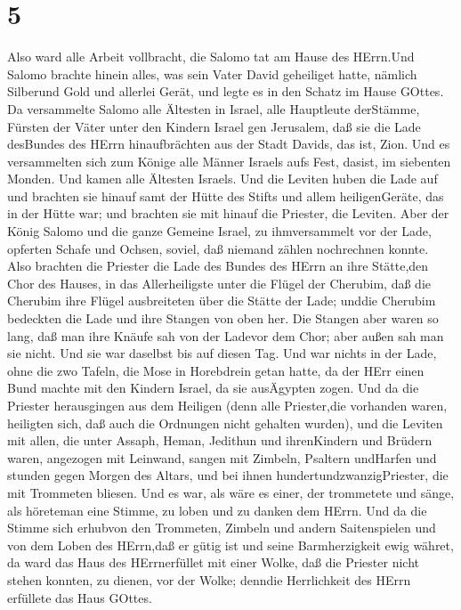 \hypertarget{section-4}{%
\section{5}\label{section-4}}

 Also ward alle Arbeit vollbracht, die Salomo tat am Hause
des HErrn.Und Salomo brachte hinein alles, was sein Vater David
geheiliget hatte, nämlich Silberund Gold und allerlei Gerät, und legte
es in den Schatz im Hause GOttes.  Da versammelte Salomo
alle Ältesten in Israel, alle Hauptleute derStämme, Fürsten der Väter
unter den Kindern Israel gen Jerusalem, daß sie die Lade desBundes des
HErrn hinaufbrächten aus der Stadt Davids, das ist, Zion. 
Und es versammelten sich zum Könige alle Männer Israels aufs Fest,
dasist, im siebenten Monden.  Und kamen alle Ältesten
Israels. Und die Leviten huben die Lade auf  und brachten
sie hinauf samt der Hütte des Stifts und allem heiligenGeräte, das in
der Hütte war; und brachten sie mit hinauf die Priester, die Leviten.
 Aber der König Salomo und die ganze Gemeine Israel, zu
ihmversammelt vor der Lade, opferten Schafe und Ochsen, soviel, daß
niemand zählen nochrechnen konnte.  Also brachten die
Priester die Lade des Bundes des HErrn an ihre Stätte,den Chor des
Hauses, in das Allerheiligste unter die Flügel der Cherubim,
 daß die Cherubim ihre Flügel ausbreiteten über die Stätte
der Lade; unddie Cherubim bedeckten die Lade und ihre Stangen von oben
her.  Die Stangen aber waren so lang, daß man ihre Knäufe
sah von der Ladevor dem Chor; aber außen sah man sie nicht. Und sie war
daselbst bis auf diesen Tag.  Und war nichts in der Lade,
ohne die zwo Tafeln, die Mose in Horebdrein getan hatte, da der HErr
einen Bund machte mit den Kindern Israel, da sie ausÄgypten zogen.
 Und da die Priester herausgingen aus dem Heiligen (denn
alle Priester,die vorhanden waren, heiligten sich, daß auch die
Ordnungen nicht gehalten wurden),  und die Leviten mit
allen, die unter Assaph, Heman, Jedithun und ihrenKindern und Brüdern
waren, angezogen mit Leinwand, sangen mit Zimbeln, Psaltern undHarfen
und stunden gegen Morgen des Altars, und bei ihnen
hundertundzwanzigPriester, die mit Trommeten bliesen.  Und
es war, als wäre es einer, der trommetete und sänge, als höreteman eine
Stimme, zu loben und zu danken dem HErrn. Und da die Stimme sich
erhubvon den Trommeten, Zimbeln und andern Saitenspielen und von dem
Loben des HErrn,daß er gütig ist und seine Barmherzigkeit ewig währet,
da ward das Haus des HErrnerfüllet mit einer Wolke,  daß
die Priester nicht stehen konnten, zu dienen, vor der Wolke; denndie
Herrlichkeit des HErrn erfüllete das Haus GOttes.

